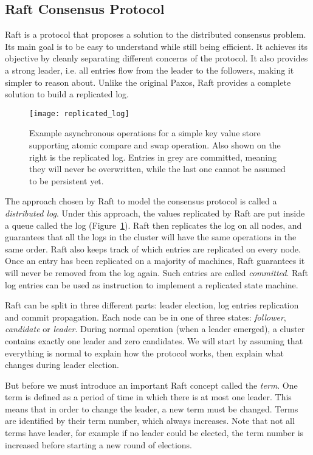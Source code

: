 \subsection{Raft Consensus Protocol}

Raft\cite{raft} is a protocol that proposes a solution to the distributed consensus problem.
Its main goal is to be easy to understand while still being efficient.
It achieves its objective by cleanly separating different concerns of the protocol.
It also provides a strong leader, i.e. all entries flow from the leader to the followers, making it simpler to reason about.
Unlike the original Paxos, Raft provides a complete solution to build a replicated log.


\begin{figure}[h]
    \centering
    \texttt{[image: replicated\_log]}
    \caption{Example asynchronous operations for a simple key value store supporting atomic compare and swap operation.
        Also shown on the right is the replicated log.
        Entries in grey are committed, meaning they will never be overwritten, while the last one cannot be assumed to be persistent yet.
    \label{fig:replicated-log}
    }
\end{figure}

The approach chosen by Raft to model the consensus protocol is called a \emph{distributed log}.
Under this approach, the values replicated by Raft are put inside a queue called the log (Figure~\ref{fig:replicated-log}).
Raft then replicates the log on all nodes, and guarantees that all the logs in the cluster will have the same operations in the same order.
Raft also keeps track of which entries are replicated on every node.
Once an entry has been replicated on a majority of machines, Raft guarantees it will never be removed from the log again.
Such entries are called \emph{committed}.
Raft log entries can be used as instruction to implement a replicated state machine.

Raft can be split in three different parts: leader election, log entries replication and commit propagation.
Each node can be in one of three states: \emph{follower}, \emph{candidate} or \emph{leader}.
During normal operation (when a leader emerged), a cluster contains exactly one leader and zero candidates.
We will start by assuming that everything is normal to explain how the protocol works, then explain what changes during leader election.

But before we must introduce an important Raft concept called the \emph{term}.
One term is defined as a period of time in which there is at most one leader.
This means that in order to change the leader, a new term must be changed.
Terms are identified by their term number, which always increases.
Note that not all terms have leader, for example if no leader could be elected, the term number is increased before starting a new round of elections.

